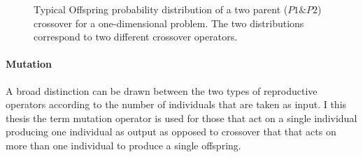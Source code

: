 \begin{figure}[h!]
\begin{minipage}[b]{0.5\linewidth}
 \centering
\end{minipage}
\begin{minipage}[b]{0.5\linewidth}
 \centering
\end{minipage}
\caption{Typical Offspring probability distribution of a two parent ($P1\& P2$) crossover for a one-dimensional problem. The two distributions correspond to two different crossover operators.}
\label{Crossover}
\end{figure}
\paragraph{Mutation}
A broad distinction can be drawn between the two types of reproductive operators according to the number of individuals that are taken as input. I this thesis the term mutation operator is used for those that act on a single individual producing one individual as output as opposed to crossover that that acts on more than one individual to produce a single offspring. 
  
